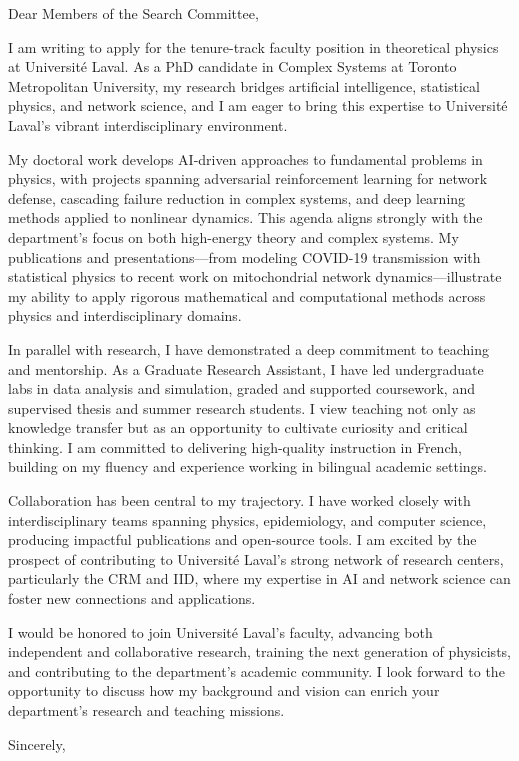 Dear Members of the Search Committee,
\vspace{1.0em}

\hspace{1.5em} I am writing to apply for the tenure-track faculty position in theoretical physics at Université Laval. As a PhD candidate in Complex Systems at Toronto Metropolitan University, my research bridges artificial intelligence, statistical physics, and network science, and I am eager to bring this expertise to Université Laval’s vibrant interdisciplinary environment.
\vspace{1.0em}

\hspace{1.5em} My doctoral work develops AI-driven approaches to fundamental problems in physics, with projects spanning adversarial reinforcement learning for network defense, cascading failure reduction in complex systems, and deep learning methods applied to nonlinear dynamics. This agenda aligns strongly with the department’s focus on both high-energy theory and complex systems. My publications and presentations—from modeling COVID-19 transmission with statistical physics to recent work on mitochondrial network dynamics—illustrate my ability to apply rigorous mathematical and computational methods across physics and interdisciplinary domains.
\vspace{1.0em}

\hspace{1.5em} In parallel with research, I have demonstrated a deep commitment to teaching and mentorship. As a Graduate Research Assistant, I have led undergraduate labs in data analysis and simulation, graded and supported coursework, and supervised thesis and summer research students. I view teaching not only as knowledge transfer but as an opportunity to cultivate curiosity and critical thinking. I am committed to delivering high-quality instruction in French, building on my fluency and experience working in bilingual academic settings.
\vspace{1.0em}

\hspace{1.5em} Collaboration has been central to my trajectory. I have worked closely with interdisciplinary teams spanning physics, epidemiology, and computer science, producing impactful publications and open-source tools. I am excited by the prospect of contributing to Université Laval’s strong network of research centers, particularly the CRM and IID, where my expertise in AI and network science can foster new connections and applications.
\vspace{1.0em}

\hspace{1.5em} I would be honored to join Université Laval’s faculty, advancing both independent and collaborative research, training the next generation of physicists, and contributing to the department’s academic community. I look forward to the opportunity to discuss how my background and vision can enrich your department’s research and teaching missions.
\vspace{1.0em}

Sincerely,\\
\myName\\[1.0em]
